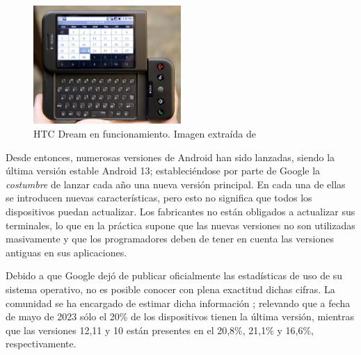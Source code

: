         \begin{figure}[h!]
            \centering
            \includegraphics[width=0.5\textwidth]{figures/HTC Dream.jpg}
            \caption[HTC Dream en funcionamiento.]{HTC Dream en funcionamiento. Imagen extraída de \cite{oryl_t-mobile_2008}}
            \label{figure:android:htc_dream}
        \end{figure}

        Desde entonces, numerosas versiones de Android han sido lanzadas, siendo la última versión estable Android 
        13; estableciéndose por parte de Google la \textit{costumbre} de lanzar cada año una nueva versión principal. 
        En cada una de ellas se introducen nuevas características, pero esto no significa que todos los dispositivos 
        puedan actualizar. Los fabricantes no están obligados a actualizar sus terminales, lo que en la práctica 
        supone que las nuevas versiones no son utilizadas masivamente y que los programadores deben de tener en 
        cuenta las versiones antiguas en sus aplicaciones. 
        

        Debido a que Google dejó de publicar oficialmente las estadísticas de uso de su sistema operativo, no es
        posible conocer con plena exactitud dichas cifras. La comunidad se ha encargado de estimar dicha 
        información \cite{belinski_android_nodate}; relevando que a fecha de mayo de 2023 sólo el 20\% de los 
        dispositivos tienen la última versión, mientras que las versiones 12,11 y 10 están presentes en el 
        20,8\%, 21,1\% y 16,6\%, respectivamente. 

